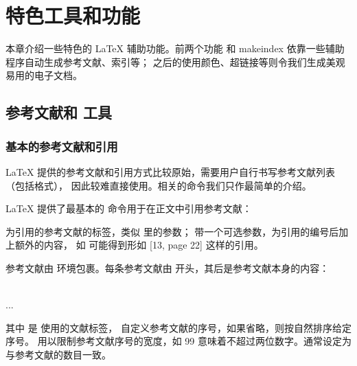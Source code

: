 \chapter{特色工具和功能}\label{chap:spec}

\begin{intro}
本章介绍一些特色的 \LaTeX{} 辅助功能。前两个功能  和 makeindex 依靠一些辅助程序自动生成参考文献、索引等；
之后的使用颜色、超链接等则令我们生成美观易用的电子文档。
\end{intro}

\section{参考文献和  工具}\label{sec:bib}

\subsection{基本的参考文献和引用}\label{subsec:bib-basics}

\LaTeX{} 提供的参考文献和引用方式比较原始，需要用户自行书写参考文献列表（包括格式），
因此较难直接使用。相关的命令我们只作最简单的介绍。

\LaTeX{} 提供了最基本的  命令用于在正文中引用参考文献：
\begin{command}
\end{command}

 为引用的参考文献的标签，类似  里的参数； 带一个可选参数，为引用的编号后加上额外的内容，
如  可能得到形如 [13, page 22] 这样的引用。

参考文献由  环境包裹。每条参考文献由  开头，其后是参考文献本身的内容：
\begin{command}
 \\
\quad {} ...\\
\end{command}
其中  是  使用的文献标签，
 自定义参考文献的序号，如果省略，则按自然排序给定序号。
 用以限制参考文献序号的宽度，如 99 意味着不超过两位数字。通常设定为与参考文献的数目一致。

